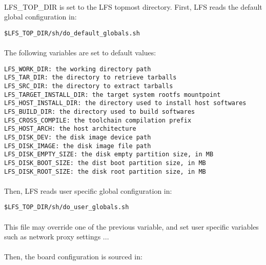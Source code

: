 \documentclass[a4paper, 11pt]{article}
\begin{document}
\paragraph{}
LFS\_TOP\_DIR is set to the LFS topmost directory. First, LFS reads the default
global configuration in:\\

\begin{lstlisting}[frame=tb]
$LFS_TOP_DIR/sh/do_default_globals.sh
\end{lstlisting}

\paragraph{}
The following variables are set to default values:\\
\begin{lstlisting}[frame=tb]
LFS_WORK_DIR: the working directory path
LFS_TAR_DIR: the directory to retrieve tarballs
LFS_SRC_DIR: the directory to extract tarballs
LFS_TARGET_INSTALL_DIR: the target system rootfs mountpoint
LFS_HOST_INSTALL_DIR: the directory used to install host softwares
LFS_BUILD_DIR: the directory used to build softwares
LFS_CROSS_COMPILE: the toolchain compilation prefix
LFS_HOST_ARCH: the host architecture
LFS_DISK_DEV: the disk image device path
LFS_DISK_IMAGE: the disk image file path
LFS_DISK_EMPTY_SIZE: the disk empty partition size, in MB
LFS_DISK_BOOT_SIZE: the dist boot partition size, in MB
LFS_DISK_ROOT_SIZE: the disk root partition size, in MB
\end{lstlisting}

\paragraph{}
Then, LFS reads user specific global configuration in:\\

\begin{lstlisting}[frame=tb]
$LFS_TOP_DIR/sh/do_user_globals.sh
\end{lstlisting}

\paragraph{}
This file may override one of the previous variable, and set user specific
variables such as network proxy settings ...

\paragraph{}
Then, the board configuration is sourced in:\\
\end{document}

